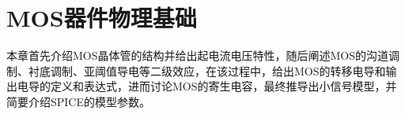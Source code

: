 \chapter{MOS器件物理基础}
本章首先介绍MOS晶体管的结构并给出起电流电压特性，随后阐述MOS的沟道调制、衬底调制、亚阈值导电等二级效应，在该过程中，给出MOS的转移电导和输出电导的定义和表达式，进而讨论MOS的寄生电容，最终推导出小信号模型，并简要介绍SPICE的模型参数。






